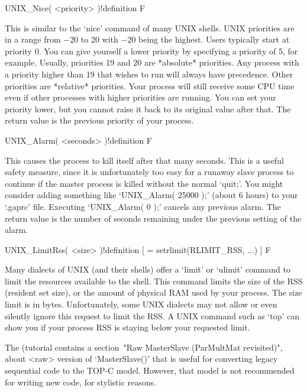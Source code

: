 \>UNIX_Nice( <priority> )!{definition} F

This is  similar  to  the  `nice'  command  of  many  UNIX  shells.  UNIX
priorities are in a range from $-20$ to 20 with $-20$ being the  highest.
Users typically start at priority  0.  You  can  give  yourself  a  lower
priority by specifying a priority of 5, for example. Usually,  priorities
19 and 20 are *absolute* priorities. Any process with a  priority  higher
than 19 that wishes to run will always have precedence. Other  priorities
are *relative* priorities. Your process will still receive some CPU  time
even if other processes with higher priorities are running. You  can  set
your priority lower, but you cannot raise it back to its  original  value
after that. The return value is the previous priority of your process.

\>UNIX_Alarm( <seconds> )!{definition} F

This causes the process to kill itself after that many seconds. This is a
useful safety measure, since it is unfortunately too easy for  a  runaway
slave process to continue if the master process  is  killed  without  the
normal `quit;'. You might consider  adding  something  like  `UNIX_Alarm(
25000 );' (about 6 hours) to your `.gaprc' file. Executing `UNIX_Alarm( 0
);' cancels any previous alarm. The return value is the number of seconds
remaining under the previous setting of the alarm.

\>UNIX_LimitRss( <size> )!{definition} [ = setrlimit(RLIMIT_RSS, ...) ] F

Many dialects of UNIX (and their shells)  offer  a  `limit'  or  `ulimit'
command to limit the resources  available  to  the  shell.  This  command
limits the size of the RSS (resident set size), or the amount of physical
RAM used by your process. The size limit is in bytes. Unfortunately, some
UNIX dialects may not allow or even silently ignore this request to limit
the RSS. A UNIX command such as `top' can show you if your process RSS is
staying below your requested limit.


The (tutorial contains a section~"Raw MasterSlave (ParMultMat revisited)",
about <raw> version of `MasterSlave()'  that  is  useful  for  converting
legacy sequential code to the TOP-C model. However,  that  model  is  not
recommended for writing new code, for stylistic reasons.

